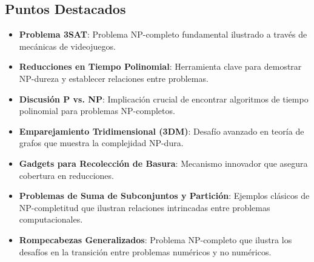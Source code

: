 \documentclass[12pt]{article}
\begin{document}
    \subsection*{Puntos Destacados}
    \begin{itemize}
        \item \textbf{Problema 3SAT}: Problema NP-completo fundamental ilustrado a través de mecánicas de videojuegos.
        \item \textbf{Reducciones en Tiempo Polinomial}: Herramienta clave para demostrar NP-dureza y establecer relaciones entre problemas.
        \item \textbf{Discusión P vs. NP}: Implicación crucial de encontrar algoritmos de tiempo polinomial para problemas NP-completos.
        \item \textbf{Emparejamiento Tridimensional (3DM)}: Desafío avanzado en teoría de grafos que muestra la complejidad NP-dura.
        \item \textbf{Gadgets para Recolección de Basura}: Mecanismo innovador que asegura cobertura en reducciones.
        \item \textbf{Problemas de Suma de Subconjuntos y Partición}: Ejemplos clásicos de NP-completitud que ilustran relaciones intrincadas entre problemas computacionales.
        \item \textbf{Rompecabezas Generalizados}: Problema NP-completo que ilustra los desafíos en la transición entre problemas numéricos y no numéricos.
    \end{itemize}
\end{document}
